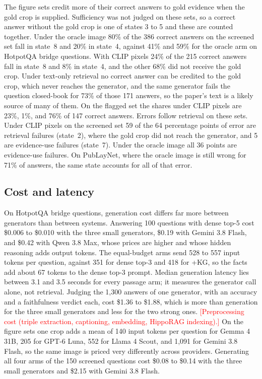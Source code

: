\documentclass[preprint,12pt]{elsarticle}
\newcommand{\tbd}[1]{\textcolor{red}{[#1]}}
\begin{document}
The figure sets credit more of their correct answers to gold evidence when the
gold crop is supplied. Sufficiency was not judged on these sets, so a correct
answer without the gold crop is one of states 3 to 5 and these are counted
together. Under the oracle image 80\% of the 386 correct answers on the screened
set fall in state~8 and 20\% in state~4, against 41\% and 59\% for the oracle arm
on HotpotQA bridge questions. With CLIP pixels 24\% of the 215 correct answers fall
in state~8 and 8\% in state~4, and the other 68\% did not receive the gold crop.
Under text-only retrieval no correct answer can be credited to the gold crop, which
never reaches the generator, and the same generator fails the question closed-book
for 73\% of those 171 answers, so the paper's text is a likely source of many of them. On the flagged
set the shares under CLIP pixels are 23\%, 1\%, and 76\% of 147 correct answers.
Errors follow retrieval on these sets. Under CLIP pixels on the screened set 59 of
the 64 percentage points of error are retrieval failures (state~2), where the gold
crop did not reach the generator, and 5 are evidence-use failures (state~7). Under
the oracle image all 36 points are evidence-use failures. On PubLayNet, where the
oracle image is still wrong for 71\% of answers, the same state accounts for all of
that error.

\subsection{Cost and latency}

On HotpotQA bridge questions, generation cost differs far more between
generators than between systems. Answering 100 questions with dense top-5
cost \$0.006 to \$0.010 with the three small generators, \$0.19 with Gemini
3.8 Flash, and \$0.42 with Qwen 3.8 Max, whose prices are higher and whose
hidden reasoning adds output tokens. The equal-budget arms send 528 to 557
input tokens per question, against 351 for dense top-3 and 418 for +KG, so
the facts add about 67 tokens to the dense top-3 prompt. Median generation
latency lies between 3.1 and 3.5 seconds for every passage arm; it measures
the generator call alone, not retrieval. Judging the 1{,}300 answers of one
generator, with an accuracy and a faithfulness verdict each, cost \$1.36 to
\$1.88, which is more than generation for the three small generators and less
for the two strong ones. \tbd{Preprocessing cost (triple extraction,
captioning, embedding, HippoRAG indexing).} On the figure sets one crop adds a mean
of 140 input tokens per question for Gemma 4 31B, 205 for GPT-6 Luna, 552 for
Llama 4 Scout, and 1{,}091 for Gemini 3.8 Flash, so the same image is priced very
differently across providers. Generating all four arms of the 150 screened
questions cost \$0.08 to \$0.14 with the three small generators and \$2.15 with
Gemini 3.8 Flash.
\end{document}
